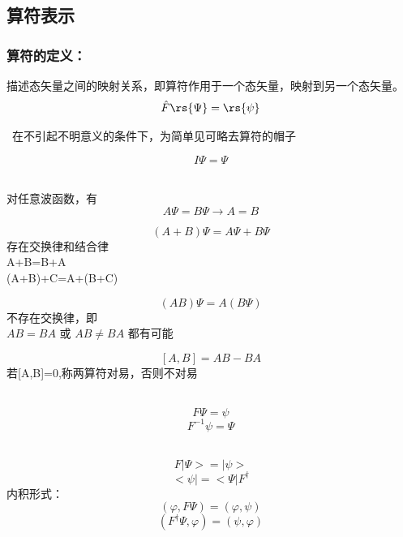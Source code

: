 \subsection{算符表示}

\begin{frame}
    \frametitle{算符的定义：}
    \begin{definition}[算符]
    描述态矢量之间的映射关系，即算符作用于一个态矢量，映射到另一个态矢量。
        \[\hat{F} \rs{\Psi}=\rs{\psi}\]
    \end{definition}
    \Tips~在不引起不明意义的条件下，为简单见可略去算符的帽子
    \begin{definition}[单位算符]
    \[I\Psi=\Psi \]
    \end{definition}   
\end{frame} 

\begin{frame}
    \begin{definition}[算符相等]
        ~~\\
    对任意波函数，有
        $$ A\Psi=B\Psi \to A=B $$
    \end{definition}
    \begin{definition}[算符的和]
        $$ (A+B)\Psi=A\Psi+B\Psi $$
        存在交换律和结合律\\
        A+B=B+A\\
        (A+B)+C=A+(B+C)
    \end{definition}
\end{frame} 

\begin{frame}
    \begin{definition} [算符的积]
        $$ (AB)\Psi=A(B\Psi) $$
        不存在交换律，即 \\
        $AB=BA$ 或 $AB\ne BA$ 都有可能
    \end{definition}
    \begin{definition}[对易子]
        $$ [A,B]=AB-BA$$
        若[A,B]=0,称两算符对易，否则不对易
    \end{definition}
\end{frame} 

\begin{frame}
    \begin{definition}[逆算符]   
        $$ F\Psi=\psi $$
        $$ F^{-1}\psi=\Psi $$
    \end{definition}
    \begin{definition}[伴算符] 
        $$ F|\Psi> = |\psi> $$
        $$ <\psi| = <\Psi|F^{\dagger} $$
        内积形式：
        $$ (\varphi,F\Psi)=(\varphi,\psi)$$ 
        $$ (F^\dagger \Psi,\varphi)=(\psi,\varphi)$$ 
    \end{definition}  
\end{frame} 

